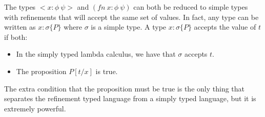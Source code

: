 \documentclass[12pt,a4paper,titlepage]{article}
\begin{document}
    The types $<x:\phi\ \psi>$ and $(fn\ x:\phi\ \psi)$ can both be reduced to simple types with refinements
    that will accept the same set of values.
    In fact, any type can be written as $x:\sigma\{P\}$ where $\sigma$ is a simple type.
    A type $x:\sigma\{P\}$ accepts the value of $t$ if both:
    \begin{itemize}
        \item In the simply typed lambda calculus, we have that $\sigma$ accepts $t$.
        \item The proposition $P[t/x]$ is true.
    \end{itemize}
    The extra condition that the proposition must be true is the only thing that separates the refinement typed
    language from a simply typed language, but it is extremely powerful.
\end{document}
